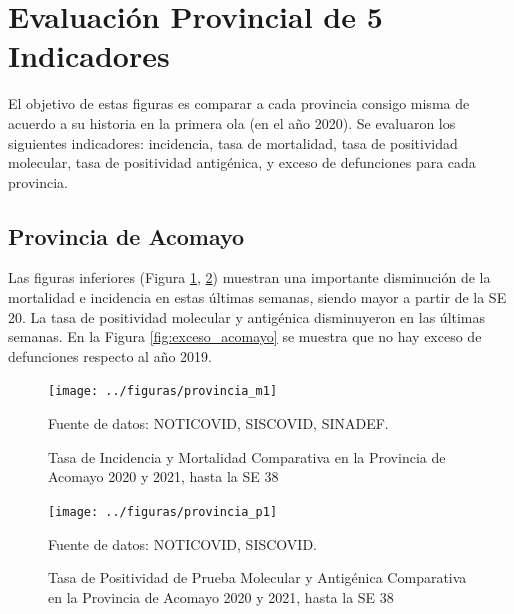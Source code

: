 \documentclass[12pt,a4paper,openany]{book}
\begin{document}
	\newpage
	
	\section*{Evaluación Provincial de 5 Indicadores}
	\noindent El objetivo de estas figuras es comparar a cada provincia consigo misma de acuerdo a su historia  en la primera ola (en el año 2020). Se evaluaron los siguientes indicadores: incidencia, tasa de mortalidad, tasa de positividad molecular, tasa de positividad antigénica, y exceso de defunciones para cada provincia.
	
	\subsection*{Provincia de Acomayo}
	\noindent Las figuras inferiores (Figura \ref{fig:inc_mort_acomayo}, \ref{fig:positividad_acomayo}) muestran una importante disminución de la mortalidad e incidencia en estas últimas semanas, siendo mayor a partir de la SE 20. La tasa de positividad molecular y antigénica disminuyeron en las últimas semanas. En la Figura \ref{fig:exceso_acomayo} se muestra que no hay exceso de defunciones respecto al año 2019.
	
	\begin{figure}[h]
		\caption{Tasa de Incidencia y Mortalidad Comparativa en la Provincia de Acomayo 2020 y 2021, hasta la SE 38}\label{fig:inc_mort_acomayo}
		\begin{center}
			\texttt{[image: ../figuras/provincia\_m1]}
		\end{center}
		{\footnotesize {Fuente de datos: NOTICOVID, SISCOVID, SINADEF.}}
	\end{figure}

	\begin{figure}[h]
	\caption{Tasa de Positividad de Prueba Molecular y Antigénica Comparativa en la Provincia de Acomayo 2020 y 2021, hasta la SE 38}\label{fig:positividad_acomayo}
	\begin{center}
		\texttt{[image: ../figuras/provincia\_p1]}
	\end{center}
	{\footnotesize {Fuente de datos: NOTICOVID, SISCOVID.}}
	\end{figure}
\end{document}
